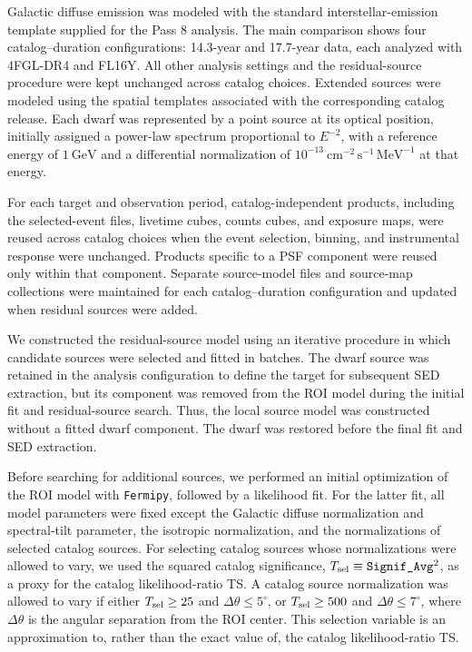 \documentclass[superscriptaddress,
showpacs,preprintnumbers,nofootinbib,eqsecnum,amsmath,amssymb,aps,11pt, groupedaddress, floatfix]{revtex4-2}
\begin{document}
Galactic diffuse emission was modeled with the standard interstellar-emission template supplied for the Pass 8 analysis. 
The main comparison shows four catalog--duration configurations: 14.3-year and 17.7-year data, each analyzed with 4FGL-DR4 and FL16Y.
All other analysis settings and the residual-source procedure were kept unchanged across catalog choices.
Extended sources were modeled using the spatial templates associated with the corresponding catalog release. Each dwarf was represented by a point source at its optical position, initially assigned a power-law spectrum proportional to $E^{-2}$, with a reference energy of $1~\mathrm{GeV}$ and a differential normalization of $10^{-13}~\mathrm{cm}^{-2}\,\mathrm{s}^{-1}\,\mathrm{MeV}^{-1}$ at that energy.

For each target and observation period, catalog-independent products, including the selected-event files, livetime cubes, counts cubes, and exposure maps, were reused across catalog choices when the event selection, binning, and instrumental response were unchanged. 
Products specific to a PSF component were reused only within that component. 
Separate source-model files and source-map collections were maintained for each catalog--duration configuration and updated when residual sources were added.

We constructed the residual-source model using an iterative procedure in which candidate sources were selected and fitted in batches. 
The dwarf source was retained in the analysis configuration to define the target for subsequent SED extraction, but its component was removed from the ROI model during the initial fit and residual-source search. 
Thus, the local source model was constructed without a fitted dwarf component. 
The dwarf was restored before the final fit and SED extraction.

Before searching for additional sources, we performed an initial optimization of the ROI model with \texttt{Fermipy}, followed by a likelihood fit. 
For the latter fit, all model parameters were fixed except the Galactic diffuse normalization and spectral-tilt parameter, the isotropic normalization, and the normalizations of selected catalog sources. 
For selecting catalog sources whose normalizations were allowed to vary, we used the squared catalog significance, $T_{\rm sel}\equiv \texttt{Signif\_Avg}^{2}$, as a proxy for the catalog likelihood-ratio TS. A catalog source normalization was allowed to vary if either $T_{\rm sel}\geq25$ and $\Delta\theta\leq5^\circ$, or $T_{\rm sel}\geq500$ and $\Delta\theta\leq7^\circ$, where $\Delta\theta$ is the angular separation from the ROI center. This selection variable is an approximation to, rather than the exact value of, the catalog likelihood-ratio TS.
\end{document}
